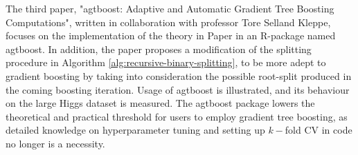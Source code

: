 The third paper, "agtboost: Adaptive and Automatic Gradient Tree Boosting Computations", written in collaboration with professor Tore Selland Kleppe, focuses
on the implementation of the theory in Paper  in an R-package named agtboost. 
In addition, the paper proposes a modification of the splitting procedure in Algorithm \ref{alg:recursive-binary-splitting}, to be more adept to gradient boosting by taking into consideration the possible root-split produced in the coming boosting iteration.
Usage of agtboost is illustrated, and its behaviour on the large Higgs dataset is measured.
The agtboost package lowers the theoretical and practical threshold for users to employ gradient tree boosting, as detailed knowledge on hyperparameter tuning and setting up $k-$fold CV in code no longer is a necessity.